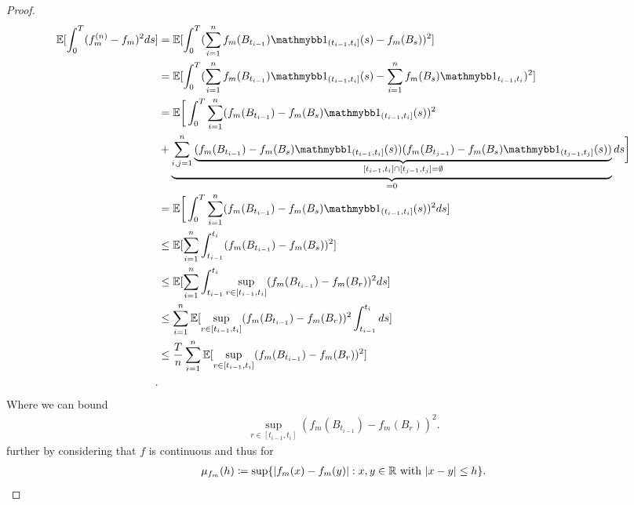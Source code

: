 \begin{proof}
\begin{align*}
  \E[\int_0^{T}  (f_m^{(n)} - f_m )^2 ds] &= \E[\int_0^{T} (\sum_{i=1}^{n} f_m(B_{t_{i-1}})\cha_{(t_{i-1},t_i]}(s) - f_m(B_s))^2 ] \\
                                          &= \E[\int_0^{T} (\sum_{i=1}^{n} f_m(B_{t_{i-1}})\cha_{(t_{i-1},t_i]}(s) - \sum_{i=1}^{n} f_m(B_s) \cha_{t_{{i-1}},t_i})^2 ] \\
                                          &= \E\bigg[\int_0^{T} \sum_{i=1}^{n} (f_m(B_{t_{i-1}})-f_{m}(B_s)\cha_{(t_{i-1},t_i]}(s))^2 \\
                                          &+ \underbrace{\sum_{i,j=1}^{n} \underbrace{(f_m(B_{t_{i-1}})-f_{m}(B_s)\cha_{(t_{i-1},t_i]}(s))(f_m(B_{t_{j-1}})-f_{m}(B_s)\cha_{(t_{j-1},t_j]}(s))}_{{[t_{i-1}},t_i] \cap [t_{j-1},t_{j}] = \emptyset }}_{=0}  ds \bigg] \\
                                          &= \E\bigg[\int_0^{T} \sum_{i=1}^{n} (f_m(B_{t_{i-1}})-f_{m}(B_s)\cha_{(t_{i-1},t_i]}(s))^2 ds] \\
                                          &\le   \E[\sum_{i=1}^{n} \int_{t_{i-1}}^{t_i} (f_m(B_{t_{i-1}}) - f_m(B_s))^2 ] \\
                                          &\le   \E[\sum_{i=1}^{n} \int_{t_{i-1}}^{t_i} \sup_{r \in [t_{i-1},t_{i}]}(f_m(B_{t_{i-1}})-f_m(B_r))^2 ds] \\
                                          &\le   \sum_{i=1}^{n} \E[\sup_{r \in [t_{i-1},t_{i}]}(f_m(B_{t_{i-1}})-f_m(B_r))^2 \int_{t_{i-1}}^{t_i}  ds] \\
                                          &\le    \frac{T}{n} \sum_{i=1}^{n} \E[\sup_{r \in [t_{i-1},t_{i}]}(f_m(B_{t_{i-1}})-f_m(B_r))^2 ] \\
.\end{align*}
Where we can bound 
\begin{align*}
  \sup_{r \in [t_{i-1},t_{i}]}(f_m(B_{t_{i-1}})-f_m(B_r))^2 
.\end{align*}
further by considering that $f$ is continuous and thus for 
\begin{align*}  
  \mu_{f_m}(h)\coloneqq  \sup \{\lvert f_m(x)-f_m(y)\rvert : x,y \in  \mathbb{R} \text{ with } \lvert x-y\rvert \le h \}
.\end{align*}

\end{proof}
